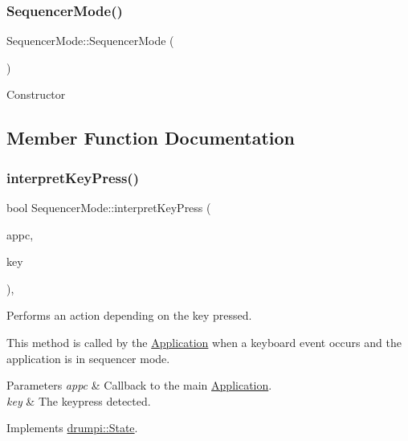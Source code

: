\subsubsection{\texorpdfstring{Sequencer\+Mode()}{SequencerMode()}}
{\footnotesize\ttfamily Sequencer\+Mode\+::\+Sequencer\+Mode (\begin{DoxyParamCaption}{ }\end{DoxyParamCaption})}

Constructor 

\subsection{Member Function Documentation}
\mbox{\label{classdrumpi_1_1SequencerMode_aaa5dea1ffd66792ba62afae00820ffc6}} 
\subsubsection{\texorpdfstring{interpret\+Key\+Press()}{interpretKeyPress()}}
{\footnotesize\ttfamily bool Sequencer\+Mode\+::interpret\+Key\+Press (\begin{DoxyParamCaption}\item[{\hyperlink{classdrumpi_1_1ApplicationCallback}{Application\+Callback} $\ast$}]{appc,  }\item[{int}]{key }\end{DoxyParamCaption})\hspace{0.3cm}{\ttfamily [override]}, {\ttfamily [virtual]}}



Performs an action depending on the key pressed. 

This method is called by the \hyperlink{classdrumpi_1_1Application}{Application} when a keyboard event occurs and the application is in sequencer mode. 
\begin{DoxyParams}{Parameters}
{\em appc} & Callback to the main \hyperlink{classdrumpi_1_1Application}{Application}. \\
\hline
{\em key} & The keypress detected. \\
\hline
\end{DoxyParams}


Implements \hyperlink{classdrumpi_1_1State_aaa6205d85513b3f717c126e0717e1dbd}{drumpi\+::\+State}.

